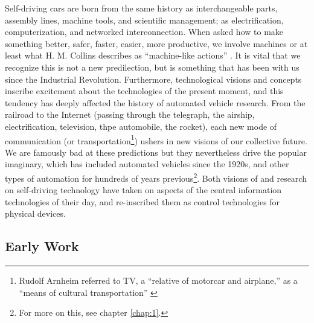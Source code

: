 Self-driving cars are born from the
same history as interchangeable parts, assembly lines, machine tools,
and scientific management; as electrification, computerization, and
networked interconnection. When asked how to make something better,
safer, faster, easier, more productive, we involve machines or at
least what H. M. Collins describes as ``machine-like actions''
\cite[p. 42]{Collins}. It is
vital that we recognize this is not a new predilection, but is
something that has been with us since the Industrial Revolution.
Furthermore, technological visions and concepts inscribe excitement about the
technologies of the present moment, and this tendency has deeply
affected the history of automated vehicle research. From the railroad to the
Internet (passing through the telegraph, the airship, electrification,
television, thpe automobile, the rocket), each new mode of
communication (or transportation\footnote{Rudolf Arnheim referred to
  TV, a ``relative of motorcar and airplane,'' as a ``means of
  cultural transportation'' \cite[p. 194]{arnheim}}) ushers in new visions of our
collective future. We are famously bad at these predictions \cite{vanriper} but they
nevertheless drive the popular imaginary, which has included automated
vehicles since the 1920s, and other types of automation for hundreds
of years previous\footnote{For more on this, see chapter
  \ref{chap:1}.}. Both visions of and research on self-driving
technology have taken on aspects of the central information
technologies of their day, and re-inscribed them as control
technologies for physical devices.

\subsection{Early Work}

